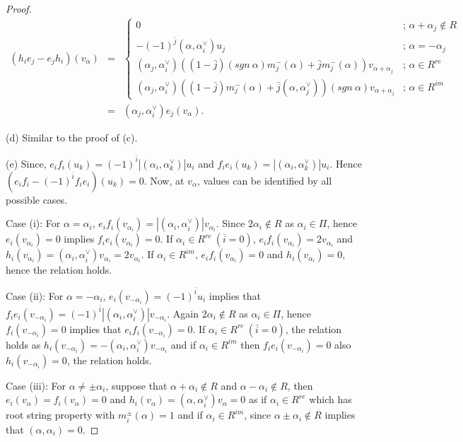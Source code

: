 \documentclass[11pt]{amsart}
\theoremstyle{plain}
\theoremstyle{definition}
\numberwithin{equation}{section}
\newcommand{\al}{\alpha}
\begin{document}
\begin{proof}
		\noindent
		\begin{eqnarray*}
			(h_i e_j-e_j h_i)(v_{\alpha})&=&\begin{cases}
				0&\text{; }\alpha+\alpha_j\notin R\\-(-1)^{\bar j}(\alpha,\alpha_i^{\vee})u_j&\text{; }\alpha=-\alpha_j\\(\alpha_j,\alpha_i^{\vee})((1-\bar{j})(sgn~\al)
				m_j^-(\alpha)+\bar{j}
				m_j^-(\alpha))v_{\alpha+\alpha_j}&\text{; }\alpha\in R^{re}\\(\alpha_j,\alpha_i^{\vee})((1-\bar{j})m_j^-(\al)+\bar{j}(\alpha,\alpha_j^{\vee}))(sgn~\al)v_{\alpha+\alpha_j}&\text{; }\alpha\in R^{im}
			\end{cases}\\
			&=&(\alpha_j,\alpha_i^{\vee}) e_j(v_{\alpha}).
		\end{eqnarray*}
		
		\noindent
		(d) Similar to the proof of (c).
		
		\noindent
		(e) Since, $e_if_i(u_k)=(-1)^{\bar i}|(\alpha_i,\alpha_k^{\vee})|u_i$ and $f_ie_i(u_k)=|( \alpha_i,\alpha_k^{\vee})|u_i$. Hence 
		$(e_if_i-(-1)^{\bar i}f_ie_i)(u_k)=0$. Now, at $v_{\alpha}$, values can be identified by all possible cases.
		
		Case (i): For $\al=\al_i$, $e_if_i(v_{\al_i})=|(\al_i,\al_i^{\vee})|v_{\al_i}$. Since $2\al_i\notin R$ as $\al_i\in\Pi$, hence $e_i(v_{\alpha_i})=0$ implies $f_ie_i(v_{\alpha_i})=0$. If $\al_i\in R^{re}~(\bar i=0)$, $e_if_i(v_{\al_i})=2v_{\al_i}$ and $h_i(v_{\al_i})=(\al_i,\al_i^{\vee})v_{\al_i}=2v_{\al_i}$. If $\al_i\in R^{im}$, $e_if_i(v_{\al_i})=0$ and $h_i(v_{\al_i})=0$, hence the relation holds.
		
		Case (ii): For $\al=-\al_i$, $e_i(v_{-\al_i})=(-1)^{\bar i}u_i$ implies that $f_ie_i(v_{-\al_i})=(-1)^{\bar i}|(\al_i,\al_i^{\vee})|v_{-\al_i}$. Again $2\al_i\notin R$ as $\al_i\in\Pi$, hence $f_i(v_{-\alpha_i})=0$ implies that $e_if_i(v_{-\alpha_i})=0$. If $\al_i\in R^{re}~(\bar i=0)$, the relation holds as $h_i(v_{-\al_i})=-(\al_i,\al_i^{\vee})v_{-\al_i}$ and if $\al_i\in R^{im}$ then $f_ie_i(v_{-\al_i})=0$ also $h_i(v_{-\al_i})=0$, the relation holds.
		
		Case (iii): For $\al\neq\pm\al_i$, suppose that $\al+\al_i\notin R$ and $\al-\al_i\notin R$, then $e_i(v_{\al})=f_i(v_{\al})=0$ and $h_i(v_{\al})=(\al,\al_i^{\vee})v_{\al}=0$ as if $\al_i\in R^{re}$ which has root string property with $m_i^{\pm}(\al)=1$ and if $\al_i\in R^{im}$, since $\al\pm\al_i\notin R$ implies that $(\al,\al_i)=0$.
		

\end{proof}
\end{document}
